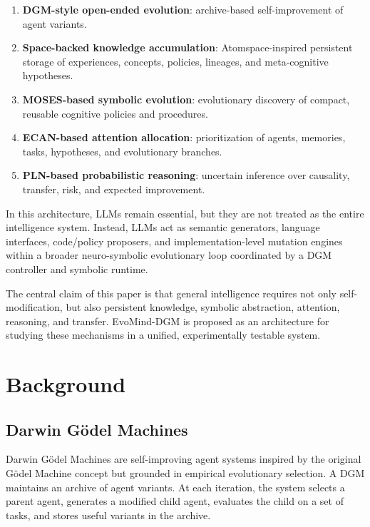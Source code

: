 \documentclass[11pt]{article}
\begin{document}
\begin{enumerate}[leftmargin=*]
    \item \textbf{DGM-style open-ended evolution}: archive-based self-improvement of agent variants.
    \item \textbf{Space-backed knowledge accumulation}: Atomspace-inspired persistent storage of experiences, concepts, policies, lineages, and meta-cognitive hypotheses.
    \item \textbf{MOSES-based symbolic evolution}: evolutionary discovery of compact, reusable cognitive policies and procedures.
    \item \textbf{ECAN-based attention allocation}: prioritization of agents, memories, tasks, hypotheses, and evolutionary branches.
    \item \textbf{PLN-based probabilistic reasoning}: uncertain inference over causality, transfer, risk, and expected improvement.
\end{enumerate}

In this architecture, LLMs remain essential, but they are not treated as the entire intelligence system. Instead, LLMs act as semantic generators, language interfaces, code/policy proposers, and implementation-level mutation engines within a broader neuro-symbolic evolutionary loop coordinated by a DGM controller and symbolic runtime.

The central claim of this paper is that general intelligence requires not only self-modification, but also persistent knowledge, symbolic abstraction, attention, reasoning, and transfer. EvoMind-DGM is proposed as an architecture for studying these mechanisms in a unified, experimentally testable system.

\section{Background}

\subsection{Darwin G\"odel Machines}

Darwin G\"odel Machines are self-improving agent systems inspired by the original G\"odel Machine concept but grounded in empirical evolutionary selection. A DGM maintains an archive of agent variants. At each iteration, the system selects a parent agent, generates a modified child agent, evaluates the child on a set of tasks, and stores useful variants in the archive.
\end{document}
